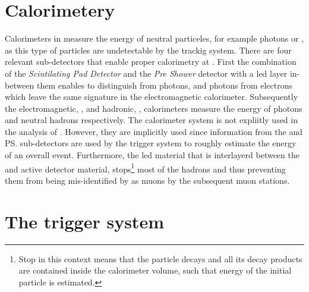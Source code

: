 \section{Calorimetery}
\label{det_calo}
Calorimeters in \lhcb measure the energy of neutral particeles, for example photons or \piz,
as this type of particles are undetectable by the trackig system. There are four relevant sub-detectors
that enable proper calorimetry at \lhcb. First the combination of the {\it Scintilating Pad Detector} \spd
and the {\it Pre Shower} detector with a led layer in-between them enables to distinguish \piz from
photons, and photons from electrons which leave the same signature in the electromagnetic calorimeter.
Subsequently the electromagnetic, \ecal, and hadronic, \hcal, calorimeters measure the energy of photons
and neutral hadrons respectively. The calorimeter system is not expliitly used in the analysis of .
However, they are implicitly used since information from the \spd and \ps sub-detectors are used
by the \lzero trigger system to roughly estimate the energy of an overall event. Furthermore, the
led material that is interlayerd between the \ecal and \hcal active detector material, stops\footnote{Stop
in this context means that the particle decays and all its decay products are contained inside the calorimeter
volume, such that energy of the initial particle is estimated.} most of the hadrons and thus preventing them
from being mis-identified by as muons by the subsequent muon stations.

\section{The trigger system}
\label{det_trigger}


%

